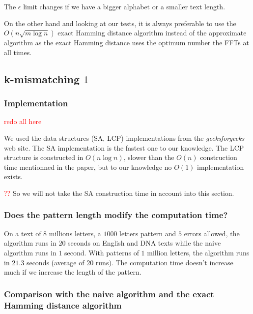 \documentclass[preprint,12pt]{elsarticle}
\begin{document}
The $\epsilon$ limit changes if we have a bigger alphabet or a smaller text length.

On the other hand and looking at our tests,
it is always preferable to use the $O(n \sqrt{m \log n})$ exact Hamming distance algorithm
instead of the approximate algorithm as the exact Hamming distance uses the optimum number the FFTs at all times.







\subsection{k-mismatching $1$}

\subsubsection*{Implementation}

\textcolor{red}{redo all here}

We used the data structures (SA, LCP) implementations from the \textit{geeksforgeeks} \cite{geek} web site.
The SA implementation is the fastest one to our knowledge. %
The LCP structure is constructed in $O(n \log n)$,
slower than the $O(n)$ construction time mentionned in the paper,
but to our knowledge no $O(1)$ implementation exists.

\textcolor{red}{??}
So we will not take the SA construction time in account into this section.

\subsubsection*{Does the pattern length modify the computation time?}

On  a text of $8$ millions letters, a $1 000$ letters pattern and $5$ errors allowed,
the algorithm runs in $20$ seconds on English and DNA texts while the naive algorithm runs in $1$ second.
With patterns of $1$ million letters, the algorithm runs in $21.3$ seconds (average of $20$ runs).
The computation time doesn't increase much if we increase the length of the pattern.



\subsubsection*{Comparison with the naive algorithm and the exact Hamming distance algorithm}
\end{document}
